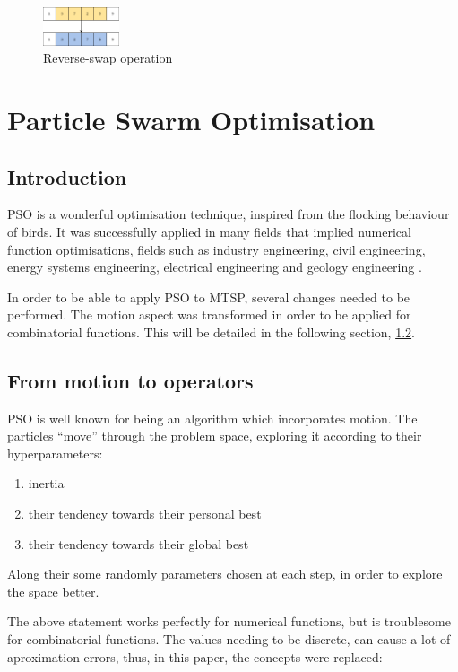 \documentclass[conference]{IEEEtran}
\begin{document}
\begin{figure}[h]
    \centering
    \includegraphics[width=0.20\textwidth]{images/mutation 3.png}
    \caption{Reverse-swap operation} \label{Reverse-swap operation}
\end{figure}

\section{Particle Swarm Optimisation}

\subsection{Introduction}
PSO is a wonderful optimisation technique, inspired from the flocking behaviour of birds. It was successfully applied in
many fields that implied numerical function optimisations, fields such as industry engineering, civil engineering, energy
systems engineering, electrical engineering and geology engineering \cite{b8}.

In order to be able to apply PSO to MTSP, several changes needed to be performed. The motion aspect was transformed in order
to be applied for combinatorial functions. This will be detailed in the following section, \ref{PSO motion subsection}.

\subsection{From motion to operators} \label{PSO motion subsection}
PSO is well known for being an algorithm which incorporates motion. The particles ``move'' through the problem space, exploring
it according to their hyperparameters:

\begin{enumerate}
    \item inertia
    \item their tendency towards their personal best
    \item their tendency towards their global best
\end{enumerate}

Along their some randomly parameters chosen at each step, in order to explore the space better.

The above statement works perfectly for numerical functions, but is troublesome for combinatorial functions. The values needing
to be discrete, can cause a lot of aproximation errors, thus, in this paper, the concepts were replaced:
\end{document}

